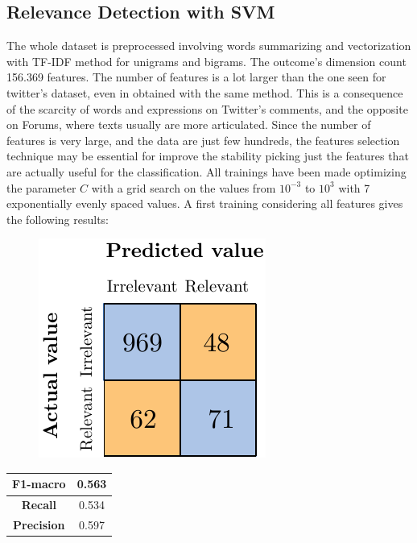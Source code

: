 \subsection{Relevance Detection with SVM}

The whole dataset is preprocessed involving words summarizing and vectorization with TF-IDF method for unigrams and bigrams. The outcome's dimension count 156.369 features. The number of features is a lot larger than the one seen for twitter's dataset, even in obtained with the same method. This is a consequence of the scarcity of words and expressions on Twitter's comments, and the opposite on Forums, where texts usually are more articulated. Since the number of features is very large, and the data are just few hundreds, the features selection technique may be essential for improve the stability picking just the features that are actually useful for the classification. All trainings have been made optimizing the parameter $C$ with a grid search on the values from $10^{-3}$ to $10^3$ with 7 exponentially evenly spaced values. A first training considering all features gives the following results:

\begin{figure}[H]
	\centering
	\includegraphics[scale=1]{figures/conf_matrices/ita_rel_svm/ita_rel_svm_bfs.pdf}
	\label{fig:ita_rel_svm_bfs}
\end{figure}

\begin{center}
	\begin{tabular}{ | c | c | } 
		\hline
		\textbf{F1-macro} & 0.563 \\
		\hline
		\textbf{Recall} & 0.534 \\ 
		\hline
		\textbf{Precision} & 0.597 \\ 
		\hline
	\end{tabular}
\end{center}

